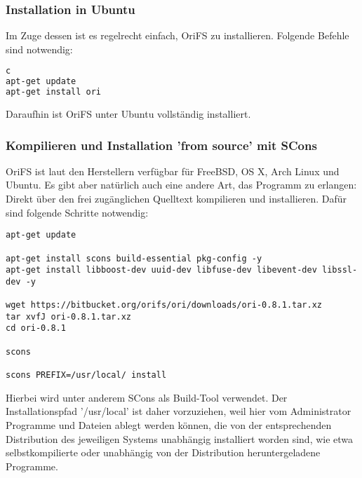 \clearpage

\subsubsection{Installation in Ubuntu}
\label{subsubsec:Installation in Ubuntu}
Im Zuge dessen ist es regelrecht einfach, OriFS zu installieren. Folgende Befehle sind notwendig:
\begin{lstlisting}[frame=single, language=bash, caption=Anleitung zur Installation]c
apt-get update
apt-get install ori
\end{lstlisting}
Daraufhin ist OriFS unter Ubuntu vollständig installiert.

\subsubsection{Kompilieren und Installation 'from source' mit SCons}
\label{subsubsec:Kompilieren und Installation 'from source' mit SCons}
OriFS ist laut den Herstellern verfügbar für FreeBSD, OS X, Arch Linux und Ubuntu.
Es gibt aber natürlich auch eine andere Art, das Programm zu erlangen: Direkt über den frei zugänglichen Quelltext kompilieren und installieren. Dafür sind folgende Schritte notwendig:
\begin{lstlisting}[frame=single, caption=Anleitung zur Installation 'from source']
apt-get update

apt-get install scons build-essential pkg-config -y
apt-get install libboost-dev uuid-dev libfuse-dev libevent-dev libssl-dev -y

wget https://bitbucket.org/orifs/ori/downloads/ori-0.8.1.tar.xz
tar xvfJ ori-0.8.1.tar.xz
cd ori-0.8.1

scons

scons PREFIX=/usr/local/ install
\end{lstlisting}
Hierbei wird unter anderem SCons als Build-Tool verwendet. Der Installationspfad '/usr/local' ist daher vorzuziehen, weil hier vom Administrator Programme und Dateien ablegt werden können, die von der entsprechenden Distribution des jeweiligen Systems unabhängig installiert worden sind, wie etwa selbstkompilierte oder unabhängig von der Distribution heruntergeladene Programme. 

